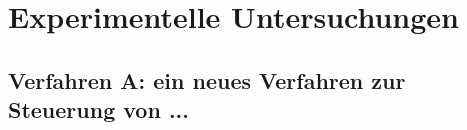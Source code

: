 \chapter{Experimentelle Untersuchungen}
\label{ch:EntwickelteMethode}

\section{Verfahren A: ein neues Verfahren zur Steuerung von ...}

\newpage
